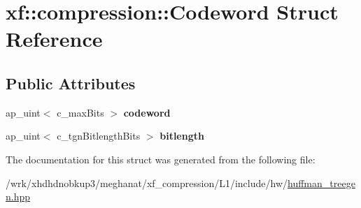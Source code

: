 \hypertarget{structxf_1_1compression_1_1Codeword}{\section{xf\-:\-:compression\-:\-:Codeword Struct Reference}
\label{structxf_1_1compression_1_1Codeword}
}
\subsection*{Public Attributes}
\begin{DoxyCompactItemize}
\item 
\hypertarget{structxf_1_1compression_1_1Codeword_a6045eb37d7c73f8a4ea0e644fc151662}{ap\-\_\-uint$<$ c\-\_\-max\-Bits $>$ {\bfseries codeword}}\label{structxf_1_1compression_1_1Codeword_a6045eb37d7c73f8a4ea0e644fc151662}

\item 
\hypertarget{structxf_1_1compression_1_1Codeword_a1833cbef40b9839df77d45984b6879f1}{ap\-\_\-uint$<$ c\-\_\-tgn\-Bitlength\-Bits $>$ {\bfseries bitlength}}\label{structxf_1_1compression_1_1Codeword_a1833cbef40b9839df77d45984b6879f1}

\end{DoxyCompactItemize}


The documentation for this struct was generated from the following file\-:\begin{DoxyCompactItemize}
\item 
/wrk/xhdhdnobkup3/meghanat/xf\-\_\-compression/\-L1/include/hw/\hyperlink{huffman__treegen_8hpp}{huffman\-\_\-treegen.\-hpp}\end{DoxyCompactItemize}
